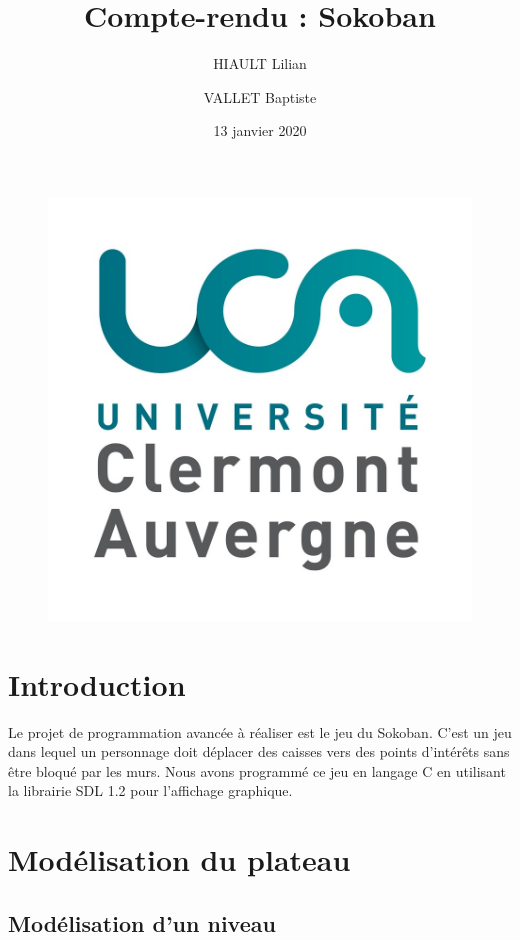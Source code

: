 \documentclass{article}
\title{Compte-rendu : Sokoban}
\author{HIAULT Lilian \and VALLET Baptiste}
\date{13 janvier 2020}
\begin{document}
\begin{figure}[t]
  \centerline{\includegraphics[scale=0.1]{logoUCA.jpg}}
\end{figure}

\maketitle

\tableofcontents

\newpage

\section*{Introduction}

Le projet de programmation avancée à réaliser est le jeu du Sokoban. C'est un jeu dans lequel un personnage doit déplacer des caisses vers des points d'intérêts sans être bloqué par les murs.
Nous avons programmé ce jeu en langage C en utilisant la librairie SDL 1.2 pour l'affichage graphique.

\section{Modélisation du plateau}

\subsection{Modélisation d'un niveau}
\end{document}
